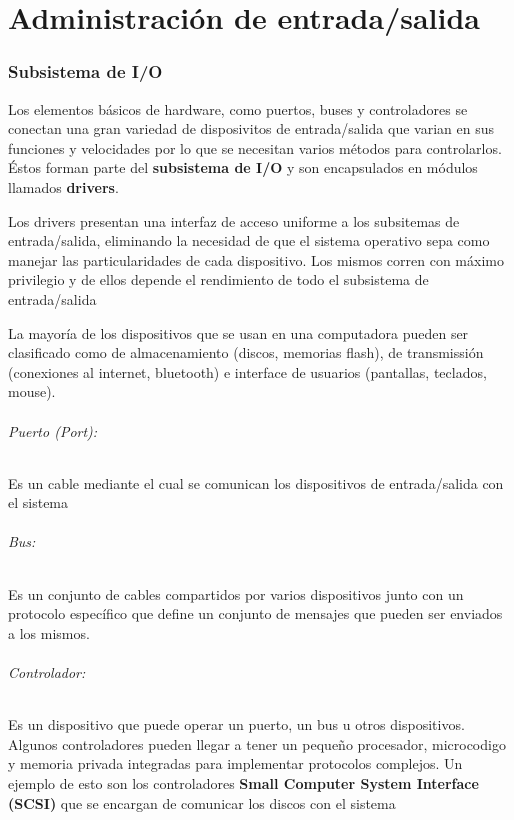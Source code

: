 \part{Administración de entrada/salida}

\section{Subsistema de I/O}
Los elementos básicos de hardware, como puertos, buses y controladores se conectan una gran variedad de disposivitos de entrada/salida que varian en sus funciones y velocidades por lo que se necesitan varios métodos para controlarlos. Éstos forman parte del \textbf{subsistema de I/O} y son encapsulados en módulos llamados \textbf{drivers}. 

Los drivers presentan una interfaz de acceso uniforme a los subsitemas de entrada/salida, eliminando la necesidad de que el sistema operativo sepa como manejar las particularidades de cada dispositivo. Los mismos corren con máximo privilegio y de ellos depende el rendimiento de todo el subsistema de entrada/salida

La mayoría de los dispositivos que se usan en una computadora pueden ser clasificado como de almacenamiento (discos, memorias flash), de transmissión (conexiones al internet, bluetooth) e interface de usuarios (pantallas, teclados, mouse).

\paragraph{Puerto (Port):} Es un cable mediante el cual se comunican los dispositivos de entrada/salida con el sistema

\paragraph{Bus:} Es un conjunto de cables compartidos por varios dispositivos junto con un protocolo específico que define un conjunto de mensajes que pueden ser enviados a los mismos.

\paragraph{Controlador:} Es un dispositivo que puede operar un puerto, un bus u otros dispositivos. Algunos controladores pueden llegar a tener un pequeño procesador, microcodigo y memoria privada integradas para implementar protocolos complejos. Un ejemplo de esto son los controladores \textbf{Small Computer System Interface (SCSI)} que se encargan de comunicar los discos con el sistema


